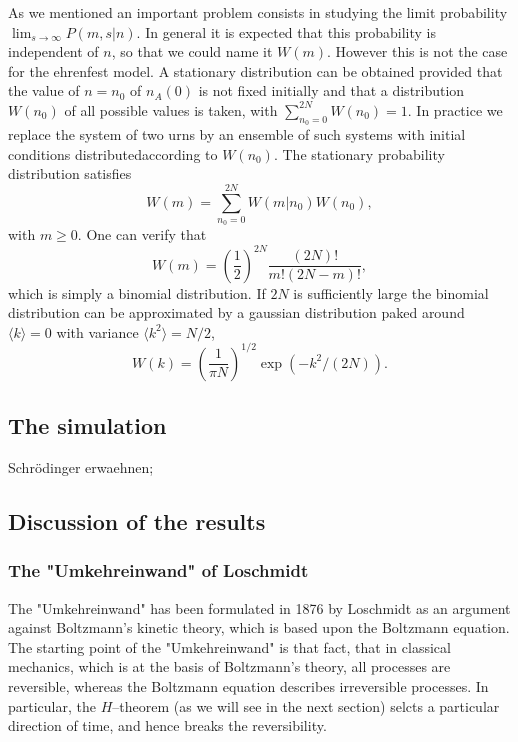 As we mentioned an important problem consists in studying the limit
probability $\lim_{s \rightarrow \infty} P(m,s|n)$. In general it is expected
that this probability is independent of $n$, so that we could name it $W(m)$.
However this is not the case for the ehrenfest model. A stationary
distribution can be obtained provided that the value of $n=n_0$ of $n_A(0)$ is
not fixed initially and that a distribution $W(n_0)$ of all possible values is
taken, with $\sum_{n_0=0}^{2N} W(n_0) = 1$. In practice we replace the system
of two urns by an ensemble of such systems with initial conditions
distributedaccording to $W(n_0)$. The stationary probability distribution 
satisfies
\begin{displaymath}
  W(m) = \sum_{n_0 = 0}^{2N} W(m|n_0) W(n_0),
\end{displaymath}
with $m \ge 0$. One can verify that
\begin{displaymath}
  W(m) = \left( \frac{1}{2} \right)^{2N} \frac{(2N)!}{m! (2N -m)!},
\end{displaymath}
which is simply a binomial distribution. If $2N$ is sufficiently large the
binomial distribution can be approximated by a gaussian distribution paked
around $\langle k \rangle =0$ with variance $\langle k^2 \rangle = N/2$,
\begin{displaymath}
  W(k) = \left( \frac{1}{\pi N} \right)^{1/2} \exp(-k^2/(2N)). 
\end{displaymath}


\subsection{The simulation}
Schr\"odinger erwaehnen;
\subsection{Discussion of the results}
\subsubsection{The "Umkehreinwand" of Loschmidt}
The "Umkehreinwand" has been formulated in 1876 by Loschmidt as an argument
against Boltzmann's kinetic theory, which is based upon the Boltzmann
equation. The starting point of the "Umkehreinwand" is that fact, that
in classical mechanics, which is at the basis of Boltzmann's theory, all
processes are reversible, whereas the Boltzmann equation describes
irreversible processes. In particular, the $H$--theorem (as we will see in the
next section) selcts a particular direction of time, and hence breaks the
reversibility.

